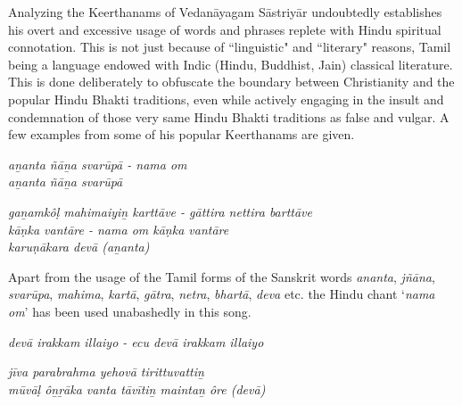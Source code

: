 \newpage

Analyzing the Keerthanams of Vedanāyagam Sāstriyār undoubtedly establishes his overt and excessive usage of words and phrases replete with Hindu spiritual connotation. This is not just because of ``linguistic" and ``literary" reasons, Tamil being a language endowed with Indic (Hindu, Buddhist, Jain) classical literature. This is done deliberately to obfuscate the boundary between Christianity and the popular Hindu Bhakti traditions, even while actively engaging in the insult and condemnation of those very same Hindu Bhakti traditions as false and vulgar. A few examples from some of his popular Keerthanams are given.

\begin{centerquote}
\textit{aṉanta ñāṉa svarūpā - nama om\\ aṉanta ñāṉa svarūpā}
\end{centerquote}

\begin{centerquote}
\textit{gaṉamkôḷ mahimaiyiṉ karttāve - gāttira nettira barttāve \\ kāṇka vantāre - nama om kāṇka vantāre\\ karuṇākara devā (aṉanta) }
\end{centerquote}

\begin{centerquote}
\end{centerquote}

\begin{myquote}
\end{myquote}

Apart from the usage of the Tamil forms of the Sanskrit words \textit{ananta}, \textit{jñāna}, \textit{svarūpa}, \textit{mahima}, \textit{kartā}, \textit{gātra}, \textit{netra}, \textit{bhartā}, \textit{deva} etc. the Hindu chant `\textit{nama om}' has been used unabashedly in this song.

\begin{centerquote}
\textit{devā irakkam illaiyo - ecu devā irakkam illaiyo}
\end{centerquote}

\begin{centerquote}
\textit{jīva parabrahma yehovā tirittuvattiṉ \\ mūvāḷ ôṉṟāka vanta tāvītiṉ maintaṉ ôre (devā)}
\end{centerquote}

